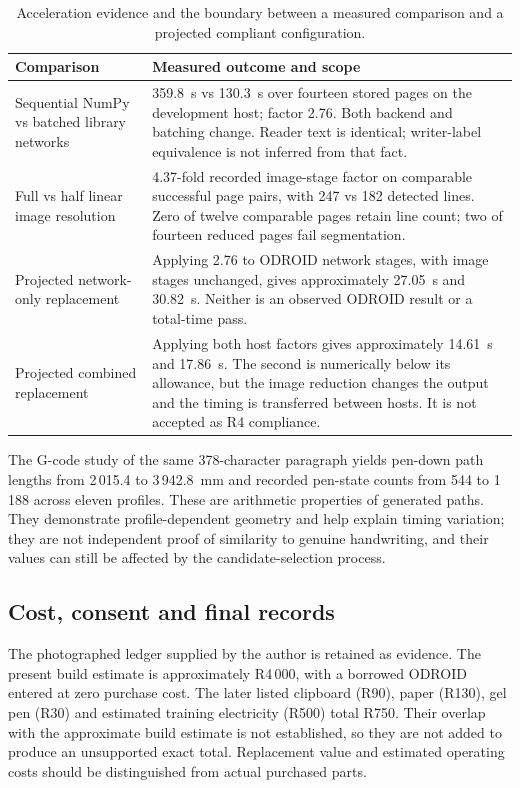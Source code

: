 \begin{table}[!htbp]\centering\small
\begin{tabularx}{\linewidth}{lX}\toprule
\textbf{Comparison} & \textbf{Measured outcome and scope}\\\midrule
Sequential NumPy vs batched library networks & 359.8~s vs 130.3~s over fourteen stored pages on the development host; factor 2.76. Both backend and batching change. Reader text is identical; writer-label equivalence is not inferred from that fact.\\[4pt]
Full vs half linear image resolution & 4.37-fold recorded image-stage factor on comparable successful page pairs, with 247 vs 182 detected lines. Zero of twelve comparable pages retain line count; two of fourteen reduced pages fail segmentation.\\[4pt]
Projected network-only replacement & Applying 2.76 to ODROID network stages, with image stages unchanged, gives approximately 27.05~s and 30.82~s. Neither is an observed ODROID result or a total-time pass.\\[4pt]
Projected combined replacement & Applying both host factors gives approximately 14.61~s and 17.86~s. The second is numerically below its allowance, but the image reduction changes the output and the timing is transferred between hosts. It is not accepted as R4 compliance.\\\bottomrule
\end{tabularx}
\caption{Acceleration evidence and the boundary between a measured comparison and a projected compliant configuration.}\label{tab:app-acceleration}\end{table}

The G-code study of the same 378-character paragraph yields pen-down path lengths from 2\,015.4 to 3\,942.8~mm and recorded pen-state counts from 544 to 1\,188 across eleven profiles. These are arithmetic properties of generated paths. They demonstrate profile-dependent geometry and help explain timing variation; they are not independent proof of similarity to genuine handwriting, and their values can still be affected by the candidate-selection process.

\subsection{Cost, consent and final records}
The photographed ledger supplied by the author is retained as evidence. The present build estimate is approximately R4\,000, with a borrowed ODROID entered at zero purchase cost. The later listed clipboard (R90), paper (R130), gel pen (R30) and estimated training electricity (R500) total R750. Their overlap with the approximate build estimate is not established, so they are not added to produce an unsupported exact total. Replacement value and estimated operating costs should be distinguished from actual purchased parts.

